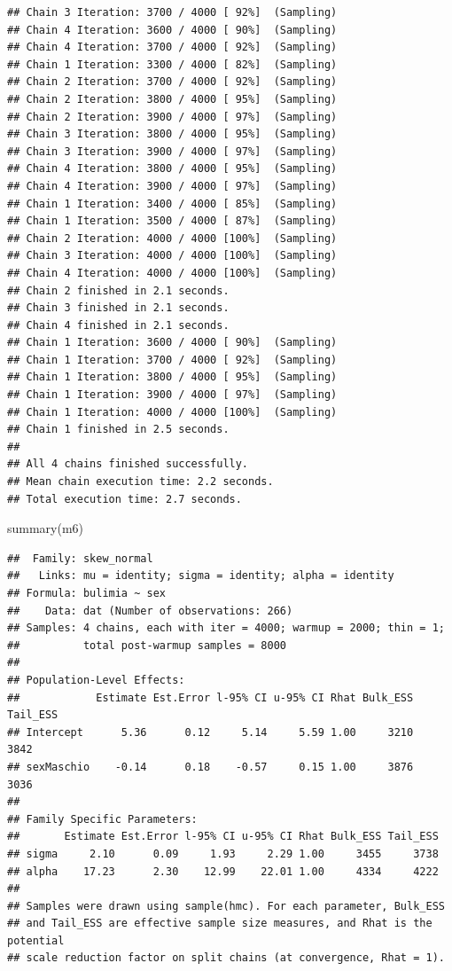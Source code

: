 \documentclass[
]{article}
\newenvironment{Shaded}{\begin{snugshade}}{\end{snugshade}}
\newcommand{\FunctionTok}[1]{\textcolor[rgb]{0.00,0.00,0.00}{#1}}
\newcommand{\NormalTok}[1]{#1}
\begin{document}
\begin{verbatim}
## Chain 3 Iteration: 3700 / 4000 [ 92%]  (Sampling) 
## Chain 4 Iteration: 3600 / 4000 [ 90%]  (Sampling) 
## Chain 4 Iteration: 3700 / 4000 [ 92%]  (Sampling) 
## Chain 1 Iteration: 3300 / 4000 [ 82%]  (Sampling) 
## Chain 2 Iteration: 3700 / 4000 [ 92%]  (Sampling) 
## Chain 2 Iteration: 3800 / 4000 [ 95%]  (Sampling) 
## Chain 2 Iteration: 3900 / 4000 [ 97%]  (Sampling) 
## Chain 3 Iteration: 3800 / 4000 [ 95%]  (Sampling) 
## Chain 3 Iteration: 3900 / 4000 [ 97%]  (Sampling) 
## Chain 4 Iteration: 3800 / 4000 [ 95%]  (Sampling) 
## Chain 4 Iteration: 3900 / 4000 [ 97%]  (Sampling) 
## Chain 1 Iteration: 3400 / 4000 [ 85%]  (Sampling) 
## Chain 1 Iteration: 3500 / 4000 [ 87%]  (Sampling) 
## Chain 2 Iteration: 4000 / 4000 [100%]  (Sampling) 
## Chain 3 Iteration: 4000 / 4000 [100%]  (Sampling) 
## Chain 4 Iteration: 4000 / 4000 [100%]  (Sampling) 
## Chain 2 finished in 2.1 seconds.
## Chain 3 finished in 2.1 seconds.
## Chain 4 finished in 2.1 seconds.
## Chain 1 Iteration: 3600 / 4000 [ 90%]  (Sampling) 
## Chain 1 Iteration: 3700 / 4000 [ 92%]  (Sampling) 
## Chain 1 Iteration: 3800 / 4000 [ 95%]  (Sampling) 
## Chain 1 Iteration: 3900 / 4000 [ 97%]  (Sampling) 
## Chain 1 Iteration: 4000 / 4000 [100%]  (Sampling) 
## Chain 1 finished in 2.5 seconds.
## 
## All 4 chains finished successfully.
## Mean chain execution time: 2.2 seconds.
## Total execution time: 2.7 seconds.
\end{verbatim}

\begin{Shaded}
\begin{Highlighting}[]
\FunctionTok{summary}\NormalTok{(m6)}
\end{Highlighting}
\end{Shaded}

\begin{verbatim}
##  Family: skew_normal 
##   Links: mu = identity; sigma = identity; alpha = identity 
## Formula: bulimia ~ sex 
##    Data: dat (Number of observations: 266) 
## Samples: 4 chains, each with iter = 4000; warmup = 2000; thin = 1;
##          total post-warmup samples = 8000
## 
## Population-Level Effects: 
##            Estimate Est.Error l-95% CI u-95% CI Rhat Bulk_ESS Tail_ESS
## Intercept      5.36      0.12     5.14     5.59 1.00     3210     3842
## sexMaschio    -0.14      0.18    -0.57     0.15 1.00     3876     3036
## 
## Family Specific Parameters: 
##       Estimate Est.Error l-95% CI u-95% CI Rhat Bulk_ESS Tail_ESS
## sigma     2.10      0.09     1.93     2.29 1.00     3455     3738
## alpha    17.23      2.30    12.99    22.01 1.00     4334     4222
## 
## Samples were drawn using sample(hmc). For each parameter, Bulk_ESS
## and Tail_ESS are effective sample size measures, and Rhat is the potential
## scale reduction factor on split chains (at convergence, Rhat = 1).
\end{verbatim}
\end{document}
